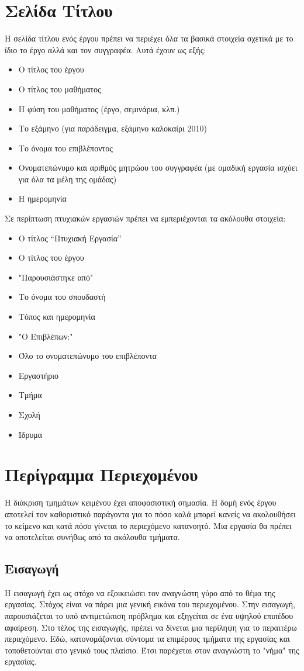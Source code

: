 \section{Σελίδα Τίτλου}
Η σελίδα τίτλου ενός έργου πρέπει να περιέχει όλα τα βασικά στοιχεία σχετικά με το ίδιο το έργο αλλά και τον συγγραφέα. Αυτά έχουν ως εξής:
\begin{itemize}
\item Ο τίτλος του έργου
\item Ο τίτλος του μαθήματος
\item Η φύση του μαθήματος (έργο, σεμινάρια, κλπ.)
\item Το εξάμηνο (για παράδειγμα, εξάμηνο καλοκαίρι 2010)
\item Το όνομα του επιβλέποντος
\item Ονοματεπώνυμο και αριθμός μητρώου του συγγραφέα (με ομαδική εργασία ισχύει για όλα τα μέλη της ομάδας)
\item Η ημερομηνία
\end{itemize}
Σε περίπτωση πτυχιακών εργασιών πρέπει να εμπεριέχονται τα ακόλουθα στοιχεία:
\begin{itemize}
\item Ο τίτλος  “Πτυχιακή Εργασία”
\item Ο τίτλος του έργου
\item "Παρουσιάστηκε από"
\item Το όνομα του σπουδαστή
\item Τόπος και ημερομηνία
\item "Ο Επιβλέπων:"
\item Όλο το ονοματεπώνυμο του επιβλέποντα
\item Εργαστήριο
\item Τμήμα
\item Σχολή
\item Ίδρυμα
\end{itemize}

\section{Περίγραμμα Περιεχομένου}
Η διάκριση τμημάτων κειμένου έχει αποφασιστική σημασία. Η δομή ενός έργου αποτελεί τον καθοριστικό παράγοντα για το πόσο καλά μπορεί κανείς να ακολουθήσει το κείμενο και κατά πόσο γίνεται το περιεχόμενο κατανοητό. Μια εργασία θα πρέπει να αποτελείται συνήθως από τα ακόλουθα τμήματα.
\subsection{Εισαγωγή}
Η εισαγωγή έχει ως στόχο να εξοικειώσει τον αναγνώστη γύρο από το θέμα της εργασίας. Στόχος είναι να πάρει μια γενική εικόνα του περιεχομένου. Στην εισαγωγή, παρουσιάζεται το υπό αντιμετώπιση πρόβλημα και εξηγείται σε ένα υψηλού επιπέδου αφαίρεση. Στο τέλος της εισαγωγής, πρέπει να δίνεται μια περίληψη για το περαιτέρω περιεχόμενο. Εδώ, κατονομάζονται σύντομα τα επιμέρους τμήματα της εργασίας και  τοποθετούνται στο γενικό τους πλαίσιο. Έτσι παρέχεται στον αναγνώστη το "νήμα" της εργασίας.
